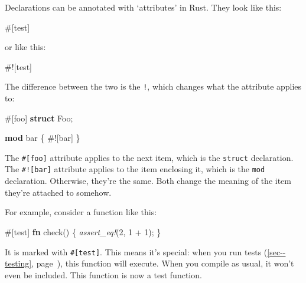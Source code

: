 \documentclass[a4paper,]{book}
\renewcommand*{\hyperref}[2][\ar]{%
  \def\ar{#2}%
  #2 (\autoref{#1}, page~\pageref{#1})}
\newenvironment{Shaded}{\begin{snugshade}}{\end{snugshade}}
\newcommand{\KeywordTok}[1]{\textcolor[rgb]{0.13,0.29,0.53}{\textbf{{#1}}}}
\newcommand{\DecValTok}[1]{\textcolor[rgb]{0.00,0.00,0.81}{{#1}}}
\newcommand{\PreprocessorTok}[1]{\textcolor[rgb]{0.56,0.35,0.01}{\textit{{#1}}}}
\newcommand{\AttributeTok}[1]{\textcolor[rgb]{0.77,0.63,0.00}{{#1}}}
\newcommand{\NormalTok}[1]{{#1}}
\begin{document}
Declarations can be annotated with `attributes' in Rust. They look like
this:

\begin{Shaded}
\begin{Highlighting}[]
\AttributeTok{#[}\NormalTok{test}\AttributeTok{]}
\end{Highlighting}
\end{Shaded}

or like this:

\begin{Shaded}
\begin{Highlighting}[]
\AttributeTok{#![}\NormalTok{test}\AttributeTok{]}
\end{Highlighting}
\end{Shaded}

The difference between the two is the \texttt{!}, which changes what the
attribute applies to:

\begin{Shaded}
\begin{Highlighting}[]
\AttributeTok{#[}\NormalTok{foo}\AttributeTok{]}
\KeywordTok{struct} \NormalTok{Foo;}

\KeywordTok{mod} \NormalTok{bar \{}
    \AttributeTok{#![}\NormalTok{bar}\AttributeTok{]}
\NormalTok{\}}
\end{Highlighting}
\end{Shaded}

The \texttt{\#{[}foo{]}} attribute applies to the next item, which is
the \texttt{struct} declaration. The \texttt{\#!{[}bar{]}} attribute
applies to the item enclosing it, which is the \texttt{mod} declaration.
Otherwise, they're the same. Both change the meaning of the item they're
attached to somehow.

For example, consider a function like this:

\begin{Shaded}
\begin{Highlighting}[]
\AttributeTok{#[}\NormalTok{test}\AttributeTok{]}
\KeywordTok{fn} \NormalTok{check() \{}
    \PreprocessorTok{assert_eq!}\NormalTok{(}\DecValTok{2}\NormalTok{, }\DecValTok{1} \NormalTok{+ }\DecValTok{1}\NormalTok{);}
\NormalTok{\}}
\end{Highlighting}
\end{Shaded}

It is marked with \texttt{\#{[}test{]}}. This means it's special: when
you run \hyperref[sec--testing]{tests}, this function will execute. When
you compile as usual, it won't even be included. This function is now a
test function.
\end{document}

